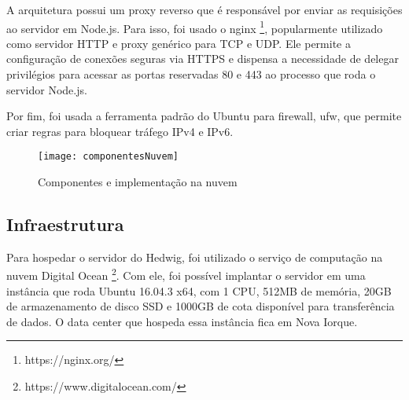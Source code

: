 A arquitetura possui um proxy reverso que é responsável por enviar as requisições ao servidor em Node.js. Para isso, foi usado o nginx \footnote{https://nginx.org/}, popularmente utilizado como servidor HTTP e proxy genérico para TCP e UDP. Ele permite a configuração de conexões seguras via HTTPS e dispensa a necessidade de delegar privilégios para acessar as portas reservadas 80 e 443 ao processo que roda o servidor Node.js.

Por fim, foi usada a ferramenta padrão do Ubuntu para firewall, ufw, que permite criar regras para bloquear tráfego IPv4 e IPv6.

\begin{figure}[H]
	\centering
	\caption{Componentes e implementação na nuvem}
  \texttt{[image: componentesNuvem]}
\label{fig:componentesNuvem}
\end{figure}

\subsection{Infraestrutura}

Para hospedar o servidor do Hedwig, foi utilizado o serviço de computação na nuvem Digital Ocean \footnote{https://www.digitalocean.com/}. Com ele, foi possível implantar o servidor em uma instância que roda Ubuntu 16.04.3 x64, com 1 CPU, 512MB de memória, 20GB de armazenamento de disco SSD e 1000GB de cota disponível para transferência de dados. O data center que hospeda essa instância fica em Nova Iorque.

